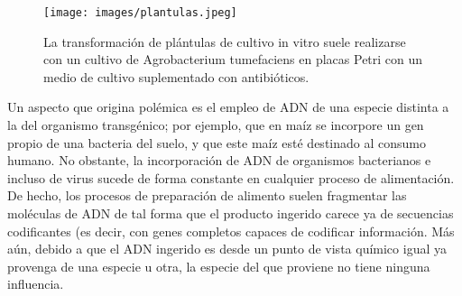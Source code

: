\documentclass[11pt,twoside]{article}
\begin{document}
%
%
%







\begin{wrapfigure}[19]{r}{5cm}
\begin{center}
\texttt{[image: images/plantulas.jpeg]}
\end{center}
\caption{La transformación de plántulas de cultivo in vitro suele realizarse con un cultivo de Agrobacterium tumefaciens en placas Petri con un medio de cultivo suplementado con antibióticos.}
\label{fig.plantula}
\end{wrapfigure}


Un aspecto que origina polémica es el empleo de ADN de una especie distinta a la del organismo transgénico; por ejemplo, que en maíz se incorpore un gen propio de una bacteria del suelo, y que este maíz esté destinado al consumo humano. No obstante, la incorporación de ADN de organismos bacterianos e incluso de virus sucede de forma constante en cualquier proceso de alimentación. De hecho, los procesos de preparación de alimento suelen fragmentar las moléculas de ADN de tal forma que el producto ingerido carece ya de secuencias codificantes (es decir, con genes completos capaces de codificar información.
Más aún, debido a que el ADN ingerido es desde un punto de vista químico igual ya provenga de una especie u otra, la especie del que proviene no tiene ninguna influencia.
\end{document}
